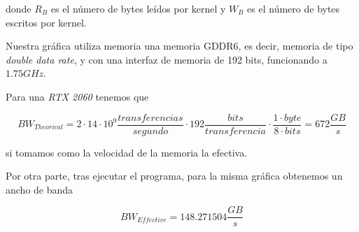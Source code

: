 donde $R_{B}$ es el número de bytes leídos por kernel y $W_{B}$ es el número de bytes
escritos por kernel.

\pagebreak

Nuestra gráfica utiliza memoria una memoria GDDR6, es decir, memoria de tipo \textit{double data rate},
y con una interfaz de memoria de 192 bits, funcionando a $1.75GHz$.

Para una \textit{RTX 2060} tenemos que

$$ BW_{Theorical} = 2 \cdot 14 \cdot 10^{9} \frac{transferencias}{segundo} \cdot 192 \frac{bits}{transferencia} \cdot \frac{1 \cdot byte}{ 8 \cdot bits} = 672 \frac{GB}{s} $$

si tomamos como la velocidad de la memoria la efectiva.

Por otra parte, tras ejecutar el programa, para la misma gráfica obtenemos un ancho de banda

$$ BW_{Effective} = 148.271504 \frac{GB}{s} $$
